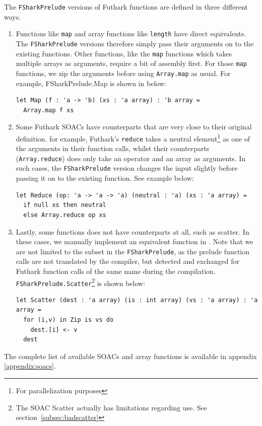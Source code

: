 The \texttt{FSharkPrelude} versions of Futhark functions are defined in three
different ways.
\begin{enumerate}
  \item Functions like \texttt{map} and array functions like
    \texttt{length} have direct \fsharp{} equivalents. The
    \texttt{FSharkPrelude} versions therefore simply pass their arguments on to
    the existing functions.
    Other functions, like the \texttt{map} functions which takes multiple arrays as
    arguments, require a bit of assembly first. For those \texttt{map} functions,
    we zip the arguments before using \texttt{Array.map} as usual.
    For example, FSharkPrelude.Map is shown in below:
\begin{verbatim}
let Map (f : 'a -> 'b) (xs : 'a array) : 'b array =
  Array.map f xs
\end{verbatim}

  \item Some Futhark SOACs have \fsharp{} counterparts that are very close to
    their original definition.
    for example, Futhark's \texttt{reduce} takes a neutral element\footnote{For
      parallelization purposes} as one of the
    arguments in their function calls, whilst their \fsharp{} counterparts
    (\texttt{Array.reduce}) does only take an operator and an array as
    arguments.
    In such cases, the \texttt{FSharkPrelude} version changes the input slightly
    before passing it on to the existing function. See example below:

\begin{verbatim}
let Reduce (op: 'a -> 'a -> 'a) (neutral : 'a) (xs : 'a array) =
  if null xs then neutral 
  else Array.reduce op xs
\end{verbatim}

  \item Lastly, some functions does not have \fsharp{} counterparts at all, such
    as scatter. In these cases, we manually implement an equivalent function in
    \fsharp{}.
    Note that we are not limited to the \fshark{} subset in the
    \texttt{FSharkPrelude}, as the prelude function calls are not translated by the
    \fshark{} compiler, but detected and exchanged for
    Futhark function calls of the same name during the \fshark{} compilation.
    \texttt{FSharkPrelude.Scatter}\footnote{The SOAC Scatter actually has limitations
      regarding \fshark{} use. See section~\ref{subsec:badscatter}} is shown below:
\begin{verbatim}
let Scatter (dest : 'a array) (is : int array) (vs : 'a array) : 'a array =
  for (i,v) in Zip is vs do
    dest.[i] <- v
  dest
\end{verbatim}

\end{enumerate}
The complete list of available SOACs and array functions is available in
appendix \ref{appendix:soacs}.

